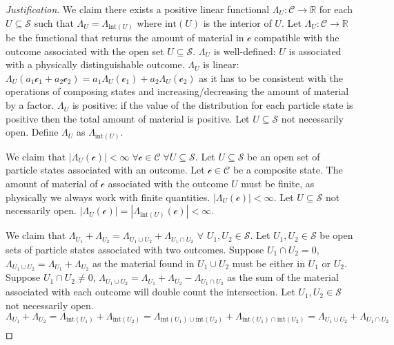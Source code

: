 \documentclass[smallextended]{svjour3}
\numberwithin{equation}{section}
\newenvironment{justification}{\emph{Justification}.}{\hfill\(\qed\)}
\theoremstyle{definition}
\newenvironment{justification}{\emph{Justification}.}{\qed}
\begin{document}
\begin{justification}
	We claim there exists a positive linear functional $\Lambda_U : \mathcal{C} \rightarrow \mathbb{R}$ for each $U \subseteq \mathcal{S}$ such that $\Lambda_U = \Lambda_{\mathrm{int}(U)}$ where $\mathrm{int}(U)$ is the interior of $U$. Let $\Lambda_{U} : \mathcal{C} \rightarrow \mathbb{R}$ be the functional that returns the amount of material in $\mathcal{c}$ compatible with the outcome associated with the open set $U \subseteq \mathcal{S}$. $\Lambda_U$ is well-defined: $U$ is associated with a physically distinguishable outcome. $\Lambda_U$ is linear: $\Lambda_U(a_1 \mathcal{c}_1 + a_2 \mathcal{c}_2) = a_1 \Lambda_U(\mathcal{c}_1) + a_2 \Lambda_U(\mathcal{c}_2)$ as it has to be consistent with the operations of composing states and increasing/decreasing the amount of material by a factor. $\Lambda_U$ is positive: if the value of the distribution for each particle state is positive then the total amount of material is positive. Let $U \subseteq \mathcal{S}$ not necessarily open. Define $\Lambda_U$ as $\Lambda_{\mathrm{int}(U)}$.
	
	We claim that $|\Lambda_{U}(\mathcal{c})| < \infty \; \forall \mathcal{c} \in \mathcal{C} \; \forall U \subseteq \mathcal{S}$. Let $U \subseteq \mathcal{S}$ be an open set of particle states associated with an outcome. Let $\mathcal{c} \in \mathcal{C}$ be a composite state. The amount of material of $\mathcal{c}$ associated with the outcome $U$ must be finite, as physically we always work with finite quantities. $|\Lambda_{U}(\mathcal{c})| < \infty$. Let $U \subseteq \mathcal{S}$ not necessarily open. $|\Lambda_{U}(\mathcal{c})| = |\Lambda_{\mathrm{int}(U)}(\mathcal{c})| < \infty$.
	
	We claim that $\Lambda_{U_1} + \Lambda_{U_2} = \Lambda_{U_1 \cup U_2} + \Lambda_{U_1 \cap U_2}$ $\forall $ $U_1, U_2 \in \mathcal{S}$. Let $U_1, U_2 \in \mathcal{S}$ be open sets of particle states associated with two outcomes. Suppose $U_1 \cap U_2 = 0$, $\Lambda_{U_1 \cup U_2} = \Lambda_{U_1} + \Lambda_{U_2}$ as the material found in $U_1 \cup U_2$ must be either in $U_1$ or $U_2$. Suppose $U_1 \cap U_2 \neq 0$, $\Lambda_{U_1 \cup U_2} = \Lambda_{U_1} + \Lambda_{U_2} - \Lambda_{U_1 \cap U_2}$ as the sum of the material associated with each outcome will double count the intersection. Let $U_1, U_2 \in \mathcal{S}$ not necessarily open. $\Lambda_{U_1} + \Lambda_{U_2} = \Lambda_{\mathrm{int}(U_1)} + \Lambda_{\mathrm{int}(U_2)} = \Lambda_{\mathrm{int}(U_1) \cup \mathrm{int}(U_2)} + \Lambda_{\mathrm{int}(U_1) \cap \mathrm{int}(U_2)} = \Lambda_{U_1 \cup U_2} + \Lambda_{U_1 \cap U_2}$
	

\end{justification}
\end{document}
